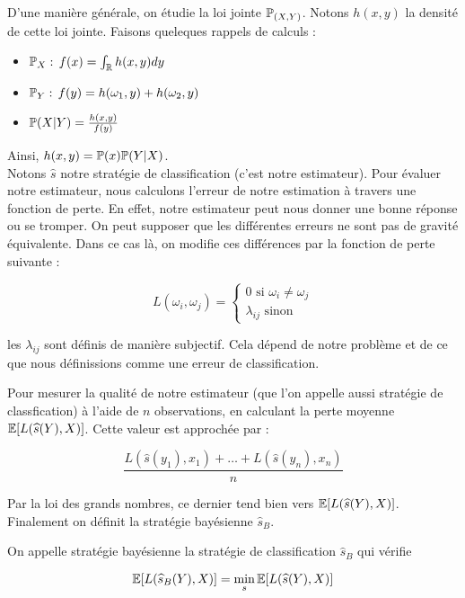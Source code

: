 D'une manière générale, on étudie la loi jointe $\P_{(X,Y)}$. Notons $h(x,y)$ la densité de cette loi jointe. Faisons queleques rappels de calculs :  
\begin{itemize}
  \item $\P_X : \, f(x) = \int_{\R} h(x,y) dy$
  \item $\P_Y : \, f(y) = h(\omega_1, y) + h(\omega_2, y)$
  \item $\P(X\vert Y) = \frac{h(x,y)}{f(y)}$
\end{itemize}

Ainsi, $h(x,y) = \P(x)\P(Y\vert X)$. \\

Notons $\widehat{s}$ notre stratégie de classification (c'est notre estimateur). Pour évaluer notre estimateur, nous calculons l'erreur de notre estimation à travers une fonction de perte. En effet, notre estimateur peut nous donner une bonne réponse ou se tromper. On peut supposer que les différentes erreurs ne sont pas de gravité équivalente. Dans ce cas là, on modifie ces différences par la fonction de perte suivante :

\[
  L(\omega_i, \omega_j) = \begin{cases}
    0 \text{ si } \omega_i \neq \omega_j \\
    \lambda_{ij} \text{ sinon}
  \end{cases}
\]

\Rq les $\lambda_{ij}$ sont définis de manière subjectif. Cela dépend de notre problème et de ce que nous définissions comme une erreur de classification.

Pour mesurer la qualité de notre estimateur (que l'on appelle aussi stratégie de classfication) à l'aide de $n$ observations, en calculant la perte moyenne $\E[L(\widehat{s}(Y), X)]$. Cette valeur est approchée par :

\[ \frac{L(\widehat{s}(y_1),x_1) + \ldots +L(\widehat{s}(y_n),x_n) }{n} \]

Par la loi des grands nombres, ce dernier tend bien vers $\E[L(\widehat{s}(Y), X)]$. Finalement on définit la stratégie bayésienne $\widehat{s}_B$.

\begin{definition}
  On appelle stratégie bayésienne la stratégie de classification $\widehat{s}_B$ qui vérifie 

  \[ \E[ L( \widehat{s}_B(Y), X) ] = \min_s \E[ L( \widehat{s}(Y), X) ] \]
\end{definition}


